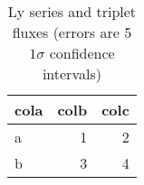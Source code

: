\begin{table}
\caption{ Ly series and  triplet fluxes (errors are 5$1\sigma$ confidence intervals) \label{tab:nely}}
  \begin{tabular}{lrr}\hline
  cola & colb & colc\\
  \hline
      a & 1 & 2\\
      b & 3 & 4\\
      \hline
  \end{tabular}
\end{table}
